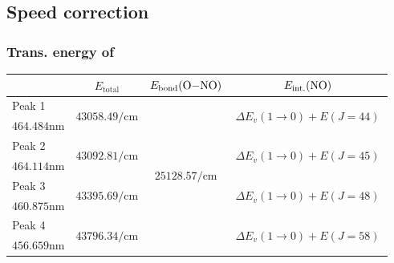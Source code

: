 \documentclass[aspectratio=43,scheme=plain]{ctexbeamer}
\begin{document}
	\subsection{Speed correction}
		\subsubsection{Trans. energy of }
	\begin{frame}{\insertsubsection}{\insertsubsubsection}
		\begin{table}[htbp]
			\centering
			\tiny
			\begin{tabularx}{0.9\textwidth}{lccc}
				\toprule
				& $E_\text{total}$ & $E_\text{bond}(\ce{O-NO})$ \footfullcite{ono}& $E_\text{int.}(\ce{NO})$ \\
				\midrule
				Peak 1 & \multirow{2}[2]{*}{$\num{43058.49}\unit{\per \centi \meter}$} & \multirow{8}[8]{*}{$\num{25128.57}\unit{\per \centi \meter}$} & \multirow{2}[2]{*}{\quad\quad\,$\Delta E_v (1\rightarrow 0)+ E( J = 44 )$\quad\quad\,} \\
				$\num{464.484}\unit{\nano\meter}$ & & & \\
				\cmidrule{1-2}\cmidrule{4-4}
				Peak 2 & \multirow{2}[2]{*}{$\num{43092.81}\unit{\per \centi \meter}$} & & \multirow{2}[2]{*}{\quad\quad\,$\Delta E_v (1\rightarrow 0)+ E( J = 45 )$\quad\quad\,} \\
				$\num{464.114}\unit{\nano\meter}$ & & & \\
				\cmidrule{1-2}\cmidrule{4-4}
				Peak 3 & \multirow{2}[2]{*}{$\num{43395.69}\unit{\per \centi \meter}$} & & \multirow{2}[2]{*}{\quad\quad\,$\Delta E_v (1\rightarrow 0)+ E( J = 48 )$\quad\quad\,} \\
				$\num{460.875}\unit{\nano\meter}$ & & & \\
				\cmidrule{1-2}\cmidrule{4-4}
				Peak 4 & \multirow{2}[2]{*}{$\num{43796.34}\unit{\per \centi \meter}$} & & \multirow{2}[2]{*}{\quad\quad\,$\Delta E_v (1\rightarrow 0)+ E( J = 58 )$\quad\quad\,} \\
				$\num{456.659}\unit{\nano\meter}$ & & & \\
				\bottomrule
			\end{tabularx}
		\end{table}
	\end{frame}
\end{document}
